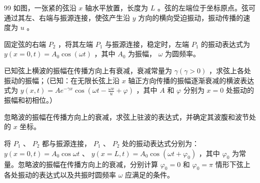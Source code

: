 \begin{problem}[第35届全国中学生物理竞赛决赛][弦的受迫振动与驻波]{99}
    如图，一张紧的弦沿 $x$ 轴水平放置，长度为 $L$ 。弦的左端位于坐标原点。弦可通过其左、右端与振源连接，使弦产生沿 $y$ 方向的横向受迫振动，振动传播的速度为 $u$ 。
    \begin{subproblem}
        固定弦的右端 $P_{2}$ ，将其左端 $P_{1}$ 与振源连接，稳定时，左端 $P_{1}$ 的振动表达式为 $y(x = 0,t) = A_0\cos (\omega t)$ ，其中 $A_0$ 为振幅， $\omega$ 为圆频率。
        \begin{subsubproblem}
            已知弦上横波的振幅在传播方向上有衰减，衰减常量为 $\gamma (\gamma >0)$ ，求弦上各处振动的振幅；（已知：在无限长弦上沿 $x$ 轴正方向传播的振幅逐渐衰减的横波表达式为 $y(x,t) = Ae^{-\gamma x}\cos \left(\omega t - \frac{\omega x}{u} +\varphi\right)$ ，其中 $A$ 和 $\varphi$ 分别为 $x = 0$ 处振动的振幅和初相位。）
        \end{subsubproblem}
        \begin{subsubproblem}
            忽略波的振幅在传播方向上的衰减，求弦上驻波的表达式，并确定其波腹和波节处的 $x$ 坐标。
        \end{subsubproblem}
    \end{subproblem}
    \begin{subproblem}
        将 $P_{1}$ 、 $P_{2}$ 都与振源连接， $P_{1}$ 、 $P_{2}$ 处的振动表达式分别为： $y(x = 0,t) = A_0\cos \omega t$ 、 $y(x = L,t) = A_0\cos (\omega t + \varphi_0)$ ，其中 $\varphi_0$ 为常量。忽略波的振幅在传播方向上的衰减，分别计算 $\varphi_0 = 0$ 和 $\varphi_0 = \pi$ 情形下弦上各处振动的表达式以及共振时圆频率 $\omega$ 应满足的条件。
    \end{subproblem}
\end{problem}